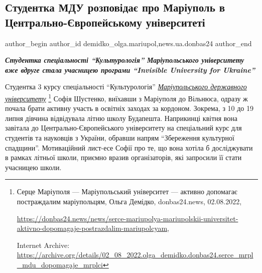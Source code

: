  
 
 
 
 
 
\subsection{Студентка МДУ розповідає про Маріуполь в Центрально-Європейському університеті}
\label{sec:07_11_2022.stz.news.ua.donbas24.1.studentka_mdu_rozpovidaje_mrpl_central_evr_univ}
 
\ifcmt
 author_begin
   author_id demidko_olga.mariupol,news.ua.donbas24
 author_end
\fi

\begin{center}
  \em\color{blue}\bfseries\Large
Студентка спеціальності \enquote{Культурологія} Маріупольського університету вже вдруге
стала учасницею програми \enquote{Invisible University for Ukraine}
\end{center}

Студентка 3 курсу спеціальності \enquote{Культурологія} \href{https://archive.org/details/02_08_2022.olga_demidko.donbas24.serce_mrpl_mdu_dopomagaje_mrplci}{\emph{Маріупольського державного університету}}%
\footnote{Серце Маріуполя — Маріупольський університет — активно допомагає постраждалим маріупольцям, Ольга Демідко, donbas24.news, 02.08.2022, \par%
\url{https://donbas24.news/news/serce-mariupolya-mariupolskii-universitet-aktivno-dopomagaje-postrazdalim-mariupolcyam}, \par%
Internet Archive: \url{https://archive.org/details/02_08_2022.olga_demidko.donbas24.serce_mrpl_mdu_dopomagaje_mrplci}%
} Софія Шустенко, виїхавши з Маріуполя до Вільнюса, одразу ж почала
брати активну участь в освітніх заходах за кордоном. Зокрема, з 10 до 19 липня
дівчина відвідувала літню школу Будапешта. Наприкинці квітня вона завітала до
Центрально-Європейського університету на спеціальний курс для студентів та
науковців з України, обравши напрям \enquote{Збереження культурної спадщини}.
Мотиваційний лист-есе Софії про те, що вона хотіла б досліджувати в рамках
літньої школи, приємно вразив організаторів, які запросили її стати учасницею
школи.

